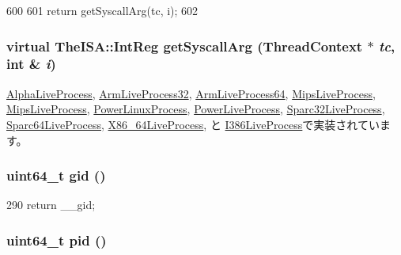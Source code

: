 \begin{DoxyCode}
600 {
601     return getSyscallArg(tc, i);
602 }
\end{DoxyCode}
\hypertarget{classLiveProcess_aa001ff57ec460026facb89ba19c7bf96}{
\subsubsection[{getSyscallArg}]{\setlength{\rightskip}{0pt plus 5cm}virtual TheISA::IntReg getSyscallArg ({\bf ThreadContext} $\ast$ {\em tc}, \/  int \& {\em i})}}
\label{classLiveProcess_aa001ff57ec460026facb89ba19c7bf96}


\hyperlink{classAlphaLiveProcess_afcdc0ffa30f2ddff7b435be15da7a6af}{AlphaLiveProcess}, \hyperlink{classArmLiveProcess32_acd6c1a25855e6ca42789dd97c86a17ac}{ArmLiveProcess32}, \hyperlink{classArmLiveProcess64_acd6c1a25855e6ca42789dd97c86a17ac}{ArmLiveProcess64}, \hyperlink{classMipsLiveProcess_ae30d5e2e0fa415fc951786462325dde3}{MipsLiveProcess}, \hyperlink{classMipsLiveProcess_ae30d5e2e0fa415fc951786462325dde3}{MipsLiveProcess}, \hyperlink{classPowerLinuxProcess_a4a1521e60b3fd8333fc98a5565c484ec}{PowerLinuxProcess}, \hyperlink{classPowerLiveProcess_a4a1521e60b3fd8333fc98a5565c484ec}{PowerLiveProcess}, \hyperlink{classSparc32LiveProcess_abab14482db5480cf54186cb10b08491e}{Sparc32LiveProcess}, \hyperlink{classSparc64LiveProcess_abab14482db5480cf54186cb10b08491e}{Sparc64LiveProcess}, \hyperlink{classX86ISA_1_1X86__64LiveProcess_a6f33c62983b3e68106d1cdb43b9fc09c}{X86\_\-64LiveProcess}, と \hyperlink{classX86ISA_1_1I386LiveProcess_a6f33c62983b3e68106d1cdb43b9fc09c}{I386LiveProcess}で実装されています。\hypertarget{classLiveProcess_aa71ba391e05d5e24c3623f7f21edaa74}{
\subsubsection[{gid}]{\setlength{\rightskip}{0pt plus 5cm}uint64\_\-t gid ()}}
\label{classLiveProcess_aa71ba391e05d5e24c3623f7f21edaa74}



\begin{DoxyCode}
290 {return __gid;}
\end{DoxyCode}
\hypertarget{classLiveProcess_a8bce5535a19cd849d89dacf166319a1a}{
\subsubsection[{pid}]{\setlength{\rightskip}{0pt plus 5cm}uint64\_\-t pid ()}}
\label{classLiveProcess_a8bce5535a19cd849d89dacf166319a1a}




